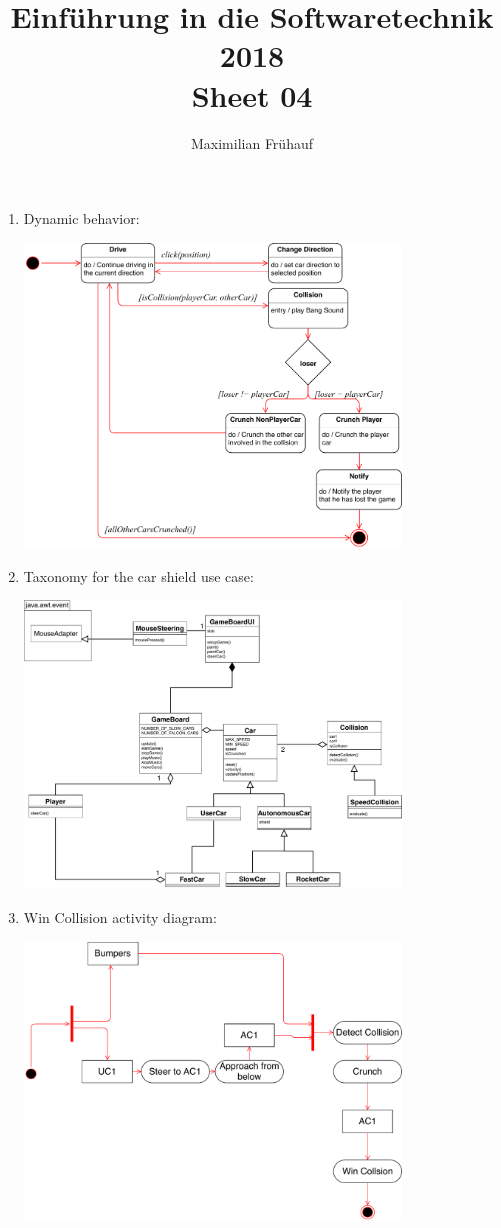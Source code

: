 \documentclass[a4paper, 10pt]{article}
\title{Einführung in die Softwaretechnik 2018 \\ Sheet 04}
\author{Maximilian Frühauf}
\begin{document}
\maketitle
\begin{enumerate}
    \item Dynamic behavior:

    \includegraphics[width=10cm]{StateChart.pdf}

    \item Taxonomy for the car shield use case:

    \includegraphics[width=10cm]{ClassDiagram.pdf}

    \item Win Collision activity diagram:

    \includegraphics[width=10cm]{ActivityDiagram.pdf}


\end{enumerate}
\end{document}
